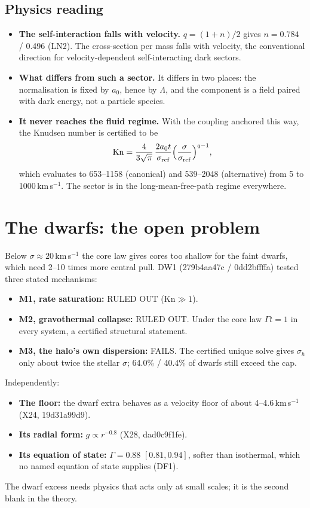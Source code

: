 \documentclass[10pt]{article}
\begin{document}
\subsection{Physics reading}
\begin{itemize}
\item \textbf{The self-interaction falls with velocity.} $q=(1+n)/2$ gives $n=0.784$ / 0.496 (LN2). The cross-section per mass falls with velocity, the conventional direction for velocity-dependent self-interacting dark sectors.
\item \textbf{What differs from such a sector.} It differs in two places: the normalisation is fixed by $a_0$, hence by $\Lambda$, and the component is a field paired with dark energy, not a particle species.
\item \textbf{It never reaches the fluid regime.} With the coupling anchored this way, the Knudsen number is certified to be
\[
\mathrm{Kn}=\frac{4}{3\sqrt\pi}\,\frac{2a_0t}{\sigma_{\rm ref}}\Big(\frac{\sigma}{\sigma_{\rm ref}}\Big)^{q-1},
\]
which evaluates to 653--1158 (canonical) and 539--2048 (alternative) from 5 to 1000\,km\,s$^{-1}$. The sector is in the long-mean-free-path regime everywhere.
\end{itemize}

\section{The dwarfs: the open problem}
Below $\sigma\approx20$\,km\,s$^{-1}$ the core law gives cores too shallow for the faint dwarfs, which need 2--10 times more central pull. DW1 (279b4aa47c / 0dd2bffffa) tested three stated mechanisms:
\begin{itemize}
\item \textbf{M1, rate saturation:} RULED OUT ($\mathrm{Kn}\gg1$).
\item \textbf{M2, gravothermal collapse:} RULED OUT. Under the core law $\Gamma t=1$ in every system, a certified structural statement.
\item \textbf{M3, the halo's own dispersion:} FAILS. The certified unique solve gives $\sigma_h$ only about twice the stellar $\sigma$; 64.0\% / 40.4\% of dwarfs still exceed the cap.
\end{itemize}
Independently:
\begin{itemize}
\item \textbf{The floor:} the dwarf extra behaves as a velocity floor of about 4--4.6\,km\,s$^{-1}$ (X24, 19d31a99d9).
\item \textbf{Its radial form:} $g\propto r^{-0.8}$ (X28, dad0c9f1fe).
\item \textbf{Its equation of state:} $\Gamma=0.88$ $[0.81,0.94]$, softer than isothermal, which no named equation of state supplies (DF1).
\end{itemize}
The dwarf excess needs physics that acts only at small scales; it is the second blank in the theory.
\end{document}
